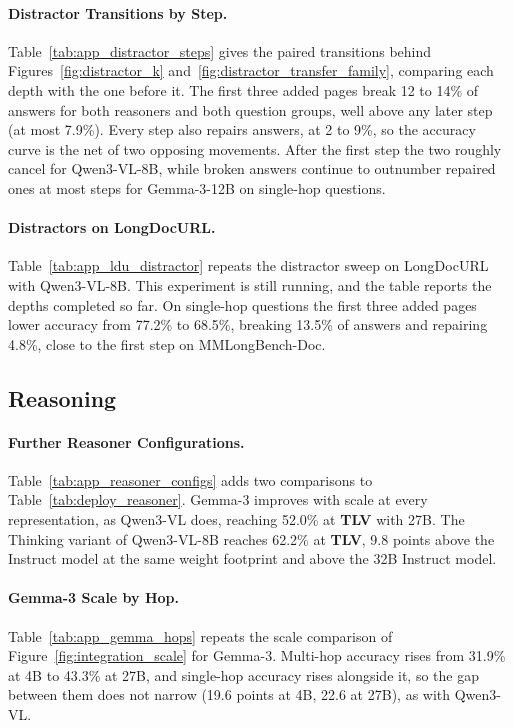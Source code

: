 \paragraph{Distractor Transitions by Step.}
Table~\ref{tab:app_distractor_steps} gives the paired transitions behind Figures~\ref{fig:distractor_k} and~\ref{fig:distractor_transfer_family}, comparing each depth with the one before it. The first three added pages break 12 to 14\% of answers for both reasoners and both question groups, well above any later step (at most 7.9\%). Every step also repairs answers, at 2 to 9\%, so the accuracy curve is the net of two opposing movements. After the first step the two roughly cancel for Qwen3-VL-8B, while broken answers continue to outnumber repaired ones at most steps for Gemma-3-12B on single-hop questions.

\paragraph{Distractors on LongDocURL.}
Table~\ref{tab:app_ldu_distractor} repeats the distractor sweep on LongDocURL with Qwen3-VL-8B. This experiment is still running, and the table reports the depths completed so far. On single-hop questions the first three added pages lower accuracy from 77.2\% to 68.5\%, breaking 13.5\% of answers and repairing 4.8\%, close to the first step on MMLongBench-Doc.

\subsection{Reasoning}
\label{app:results_reasoning}

\paragraph{Further Reasoner Configurations.}
Table~\ref{tab:app_reasoner_configs} adds two comparisons to Table~\ref{tab:deploy_reasoner}. Gemma-3 improves with scale at every representation, as Qwen3-VL does, reaching 52.0\% at \textbf{TLV} with 27B. The Thinking variant of Qwen3-VL-8B reaches 62.2\% at \textbf{TLV}, 9.8 points above the Instruct model at the same weight footprint and above the 32B Instruct model.

\paragraph{Gemma-3 Scale by Hop.}
Table~\ref{tab:app_gemma_hops} repeats the scale comparison of Figure~\ref{fig:integration_scale} for Gemma-3. Multi-hop accuracy rises from 31.9\% at 4B to 43.3\% at 27B, and single-hop accuracy rises alongside it, so the gap between them does not narrow (19.6 points at 4B, 22.6 at 27B), as with Qwen3-VL.


